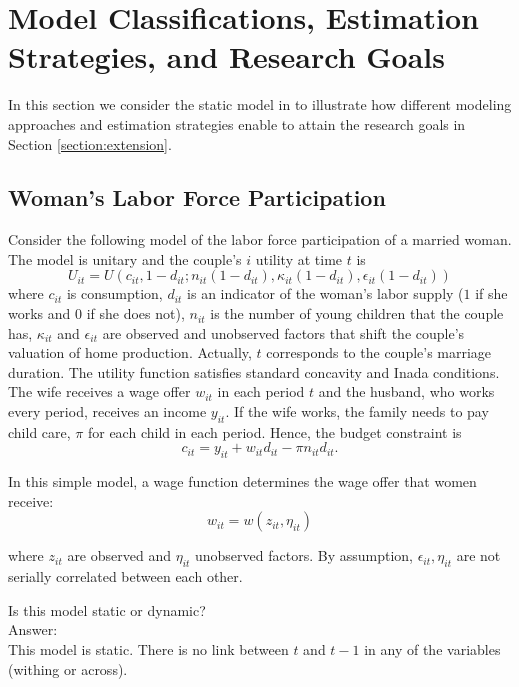 \section{Model Classifications, Estimation Strategies, and Research Goals} \label{section:models}
In this section we consider the static model in \citet{keane2011structural} to illustrate how different modeling approaches and estimation strategies enable to attain the research goals in Section \ref{section:extension}.
\subsection{Woman's Labor Force Participation} \label{section:model}
Consider the following model of the labor force participation of a married woman. The model is unitary and the couple's $i$ utility at time $t$ is
\begin{equation}
U_{it} = U \left( c_{it}, 1-d_{it}; n_{it}(1-d_{it}), \kappa_{it}(1-d_{it}), \epsilon_{it} (1-d_{it}) \right) \label{eq:utility}
\end{equation}
\noindent where $c_{it}$ is consumption, $d_{it}$ is an indicator of the woman's labor supply ($1$ if she works and $0$ if she does not), $n_{it}$ is the number of young children that the couple has, $\kappa_{it}$ and $\epsilon_{it}$ are observed and unobserved factors that shift the couple's valuation of home production. Actually, $t$ corresponds to the couple's marriage duration. The utility function satisfies standard concavity and Inada conditions.\\
\indent The wife receives a wage offer $w_{it}$ in each period $t$ and the husband, who works every period, receives an income $y_{it}$. If the wife works, the family needs to pay child care, $\pi$ for each child in each period. Hence, the budget constraint is
\begin{equation}
c_{it} = y_{it} + w_{it} d_{it} - \pi n_{it} d_{it} \label{eq:budget}.
\end{equation}

\indent In this simple model, a wage function determines the wage offer that women receive:
\begin{equation}
w_{it} = w(z_{it}, \eta_{it}) \label{eq:wage}
\end{equation} 

\noindent where $z_{it}$ are observed and $\eta_{it}$ unobserved factors. By assumption, $\epsilon_{it}, \eta_{it}$ are not serially correlated between each other.

\begin{exercise}
Is this model static or dynamic?\\
\noindent Answer:\\
\noindent This model is static. There is no link between $t$ and $t-1$ in any of the variables (withing or across). 
\end{exercise}

